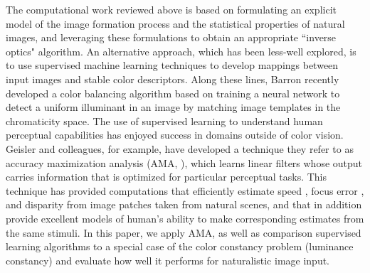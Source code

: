 \documentclass{jov}
\begin{document}
The computational work reviewed above is based on formulating an explicit model of the image formation process and the statistical properties of natural images, and leveraging these formulations to obtain an appropriate ``inverse optics" algorithm.  An alternative approach, which has been less-well explored, is to use supervised machine learning techniques to develop mappings between input images and stable color descriptors.  Along these lines, Barron \cite{barron2015convolutional} recently developed a color balancing algorithm based on training a neural network to detect a uniform illuminant in an image by matching image templates in the chromaticity space. The use of supervised learning to understand human perceptual capabilities has enjoyed success in domains outside of color vision. Geisler and colleagues, for example, have developed a technique they refer to as accuracy maximization analysis (AMA, ), which learns linear filters whose output carries information that is optimized for particular perceptual tasks. This technique has provided computations that efficiently estimate speed \cite{burge2015optimal}, focus error \cite{burge2011optimal}, and disparity \cite{burge2014optimal} 
from image patches taken from natural scenes, and that in addition provide excellent models of human's ability to make corresponding estimates from the same stimuli.  In this paper, we apply AMA, as well as comparison supervised learning algorithms to a special case of the color constancy problem (luminance constancy) and evaluate how well it performs for naturalistic image input. 
\end{document}
